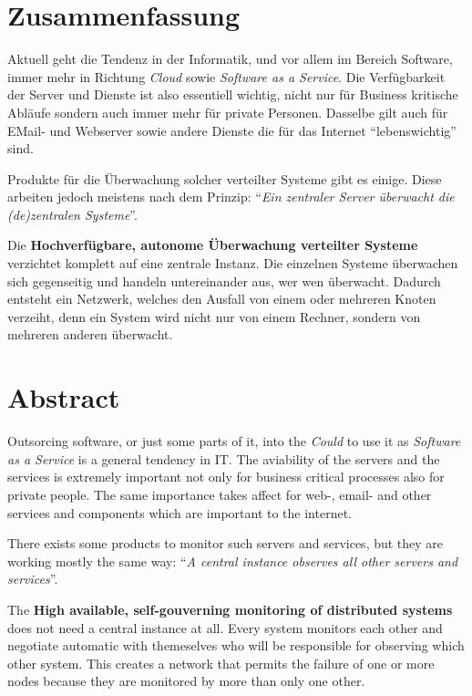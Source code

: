 \section*{Zusammenfassung}
  Aktuell geht die Tendenz in der Informatik, und vor allem im Bereich Software, immer mehr in Richtung \textit{Cloud} sowie \textit{Software as a Service}. Die Verf\"ugbarkeit der Server und Dienste ist also essentiell wichtig, nicht nur f\"ur Business kritische Abl\"aufe sondern auch immer mehr f\"ur private Personen. Dasselbe gilt auch f\"ur EMail- und Webserver sowie andere Dienste die f\"ur das Internet "`lebenswichtig"' sind.

  Produkte f\"ur die \"Uberwachung solcher verteilter Systeme gibt es einige. Diese arbeiten jedoch meistens nach dem Prinzip: "`\textit{Ein zentraler Server \"uberwacht die (de)zentralen Systeme}"'.

  Die \textbf{Hochverf\"ugbare, autonome \"Uberwachung verteilter Systeme} verzichtet komplett auf eine zentrale Instanz. Die einzelnen Systeme \"uberwachen sich gegenseitig und handeln untereinander aus, wer wen \"uberwacht. Dadurch entsteht ein Netzwerk, welches den Ausfall von einem oder mehreren Knoten verzeiht, denn ein System wird nicht nur von einem Rechner, sondern von mehreren anderen \"uberwacht.

\section*{Abstract}
  Outsorcing software, or just some parts of it, into the \textit{Could} to use it as \textit{Software as a Service} is a general tendency in IT. The aviability of the servers and the services is extremely important not only for business critical processes also for private people. The same importance takes affect for web-, email- and other services and components which are important to the internet.

  There exists some products to monitor such servers and services, but they are working mostly the same way: "`\textit{A central instance observes all other servers and services}"'.

  The \textbf{High available, self-gouverning monitoring of distributed systems} does not need a central instance at all. Every system monitors each other and negotiate automatic with themeselves who will be responsible for observing which other system. This creates a network that permits the failure of one or more nodes because they are monitored by more than only one other.